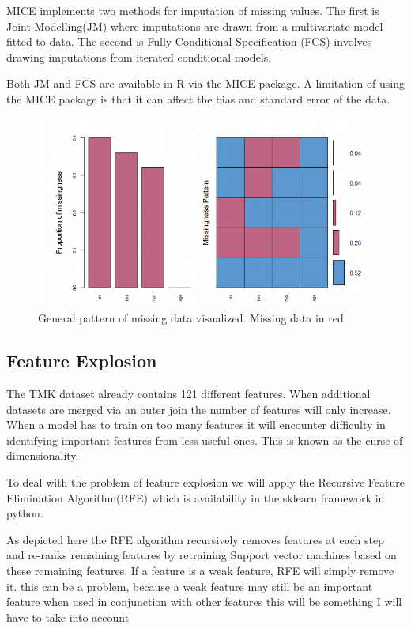 MICE implements two methods for imputation of missing values. The first is Joint Modelling(JM) where imputations are drawn from a multivariate model fitted to data. The second is Fully Conditional Specification (FCS) involves drawing imputations from iterated conditional models. 

Both JM and FCS are available in R via the MICE package. A limitation of using the MICE package is that it can affect the bias and standard error of the data.

\begin{figure}[h]
\caption{General pattern of missing data visualized. Missing data in red}
\centering
\includegraphics{missingdataimage.png}
\end{figure}



\subsection{Feature Explosion}
The TMK dataset already contains 121 different features. When additional datasets are merged via an outer join the number of features will only increase. When a model has to train on too many features it will encounter difficulty in identifying important features from less useful ones. This is known as the curse of dimensionality. 

To deal with the problem of feature explosion we will apply the Recursive Feature Elimination Algorithm(RFE) which is availability in the sklearn framework in python. 

As depicted here the RFE  algorithm recursively removes features at each step and re-ranks remaining features by retraining Support vector machines based on these remaining features. If a feature is a weak feature, RFE will simply remove it. this can be a problem, because a weak feature may still be an important feature when used in conjunction with other features this will be something I will have to take into account



